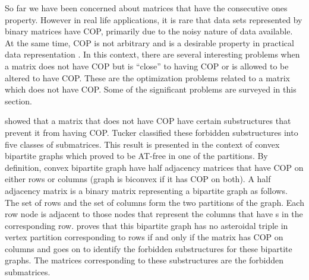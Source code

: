 So far we have been concerned about matrices that have the consecutive
ones property. However in real life applications, it is rare that data
sets represented by binary matrices have COP, primarily due to the
noisy nature of data available. At the same time, COP is not arbitrary
and is a desirable property in practical data representation
\cite{co98,jkckv04,k77}. In this context, there are several
interesting problems when a matrix does not have COP but is ``close''
to having COP or is allowed to be altered to have COP. These are the
optimization problems related to a matrix which does not have
COP. Some of the significant problems are surveyed in this section.

\cite{at72} showed that a matrix that does not have COP have certain
substructures that prevent it from having COP. Tucker classified these
forbidden substructures into five classes of submatrices. This result
is presented in the context of convex bipartite graphs which
\cite{at72} proved to be AT-free in one of the partitions. By
definition, convex bipartite graph have half adjacency matrices that
have COP on either rows or columns (graph is biconvex if it has COP on
both)\cite{d08phd}. A half adjacency matrix is a binary matrix
representing a bipartite graph as follows. The set of rows and the set
of columns form the two partitions of the graph. Each row node is
adjacent to those nodes that represent the columns that have {\un}s in
the corresponding row. \cite{at72} proves that this bipartite graph
has no asteroidal triple in vertex partition corresponding to rows if
and only if the matrix has COP on columns and goes on to identify the
forbidden substructures for these bipartite graphs. The matrices
corresponding to these substructures are the forbidden submatrices.

